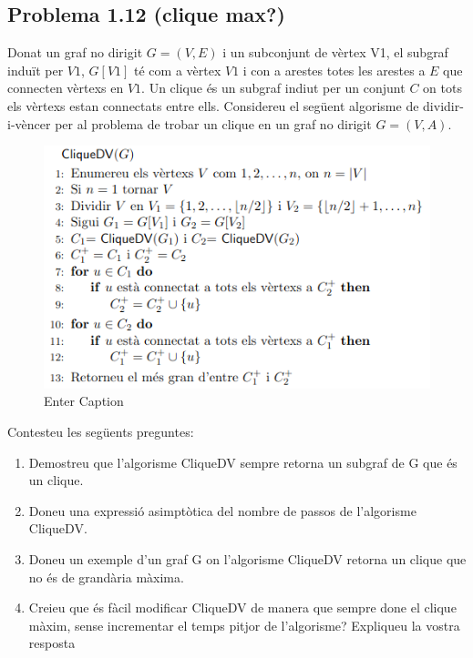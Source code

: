 \documentclass[a4paper,12pt]{article}
\begin{document}
\subsection*{Problema 1.12 (clique max?)}
Donat un graf no dirigit $G = (V, E)$ i un subconjunt de vèrtex V1, el subgraf
induït per $V1$, $G[V1]$ té com a vèrtex $V1$ i con a arestes totes les arestes a $E$ que connecten
vèrtexs en $V1$. Un clique és un subgraf indiut per un conjunt $C$ on tots els vèrtexs estan
connectats entre ells.
Considereu el següent algorisme de dividir-i-vèncer per al problema de trobar un clique en un
graf no dirigit $G = (V, A)$.
\begin{figure}[H]
    \centering
    \includegraphics[width=0.8\linewidth]{ksnip_20250219-180045.png}
    \caption{Enter Caption}
    \label{fig:enter-label}
\end{figure}
Contesteu les següents preguntes:
\begin{enumerate}[label=(\alph*)]
    \item Demostreu que l’algorisme CliqueDV sempre retorna un subgraf de G que és un clique.
    \item Doneu una expressió asimptòtica del nombre de passos de l’algorisme CliqueDV.
    \item Doneu un exemple d’un graf G on l’algorisme CliqueDV retorna un clique que no és de
grandària màxima.
    \item Creieu que és fàcil modificar CliqueDV de manera que sempre done el clique màxim,
sense incrementar el temps pitjor de l’algorisme? Expliqueu la vostra resposta
\end{enumerate}



\end{document}
